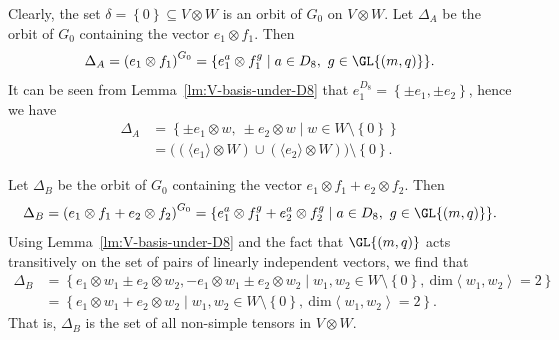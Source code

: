 Clearly, the set $\delta = \left\{0 \right\} \subseteq V \otimes W$ is an orbit of $G_0$ on $V \otimes W$. Let $\Delta_A$ be the orbit of $G_0$ containing the vector $e_1 \otimes f_1$. Then
\begin{displaymath}
\Delta_A = \left(e_1 \otimes f_1 \right)^{G_0} = {\left\{e_1^a \otimes f_1^g \mid a \in D_8,\ g \in \GL {\left(m, q \right)}\right\}}.
\end{displaymath}
It can be seen from Lemma~\ref{lm:V-basis-under-D8} that $e_1^{D_8} = \left\{\pm e_1, \pm e_2 \right\}$, hence we have
\begin{align*}
\Delta_A &= \left\{\pm e_1 \otimes w,\ \pm e_2 \otimes w \mid w \in W \setminus \left\{0 \right\}\right\} \\
&= \big(\left(\langle e_1 \rangle \otimes W \right) \cup \left(\langle e_2 \rangle \otimes W \right)\big) \setminus {\left\{0 \right\}}.
\end{align*}

Let $\Delta_B$ be the orbit of $G_0$ containing the vector $e_1 \otimes f_1 + e_2 \otimes f_2$. Then
\begin{displaymath}
\Delta_B = \left(e_1 \otimes f_1 + e_2 \otimes f_2 \right)^{G_0} = {\left\{e_1^a \otimes f_1^g + e_2^a \otimes f_2^g \mid a \in D_8,\ g \in \GL{\left(m, q \right)}\right\}}.
\end{displaymath}
Using Lemma~\ref{lm:V-basis-under-D8} and the fact that $\GL{\left(m, q \right)}$ acts transitively on the set of pairs of linearly independent vectors, we find that
\begin{align*}
\Delta_B &= {\left\{e_1 \otimes w_1 \pm e_2 \otimes w_2, -e_1 \otimes w_1 \pm e_2 \otimes w_2 \mid w_1, w_2 \in W{\setminus} {\left\{0 \right\}},\ \mathrm{dim} \left<w_1, w_2 \right> = 2 \right\}} \\
&= {\left\{e_1 \otimes w_1 + e_2 \otimes w_2 \mid w_1, w_2 \in W \setminus {\left\{0 \right\}},\ \mathrm{dim} \left<w_1, w_2 \right> = 2 \right\}}.
\end{align*}
That is, $\Delta_B$ is the set of all non-simple tensors in $V \otimes W$.

